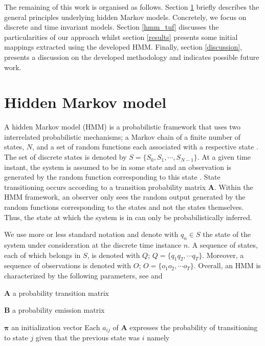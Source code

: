 \documentclass[12pt]{article}
\let\tempone\itemize
\let\temptwo\enditemize
\renewenvironment{itemize}{\tempone\setlength{\itemsep}{0pt}}{\temptwo}
\begin{document}
The remaining of this work is organised as follows. Section \ref{hmm_general} briefly describes the general principles underlying  hidden Markov models. Concretely,  we focus on discrete and time invariant models. 
Section \ref{hmm_tuf} discusses the particularities of our approach whilst section \ref{results} presents some initial mappings extracted using the developed HMM.
Finally, section \ref{discussion}, presents a discussion on the developed methodology and indicates possible future work. 

\section{Hidden Markov model}
\label{hmm_general}

A hidden Markov model (HMM) is a probabilistic framework that uses two interrelated probabilistic mechanisms; a Markov chain of a finite
number of states, $N$, and a set of random functions each associated with a respective state \cite{koski}.  The set of discrete states is denoted by $S=\{S_0, S_1,\cdots, S_{N-1}\}$. At a given time instant, the 
system is assumed to be in some state and an observation is generated by the random function corresponding to this state  \cite{koski}.
State transitioning occurs according to a transition probability matrix  $\mathbf{A}$. Within  the HMM framework, an observer only sees the random output generated by the random functions corresponding to the states and not the states themselves. Thus, the state at which the system is in can only be probabilistically inferred. 

We use more or less standard notation and denote with $q_n \in S$ the state of the system under consideration at the discrete time instance $n$.  A sequence of states, each of which belongs in $S$, is denoted with $Q$; $Q=\{q_1q_2,\cdots q_T\}$. Moreover, a sequence of observations is denoted with $O$; $O=\{o_1o_2,\cdots o_T\}$. Overall, an HMM is characterized by the following parameters, see \cite{rabiner2009} and \cite{koski}

\begin{itemize}
	\item $\mathbf{A}$ a probability transition matrix
	\item $\mathbf{B}$ a probability emission matrix
	\item $\boldsymbol{\pi}$ an initialization vector
\end{itemize}
Each $a_{ij}$ of $\mathbf{A}$  expresses the probability of transitioning to state $j$ given that the previous state was $i$ namely
\end{document}
